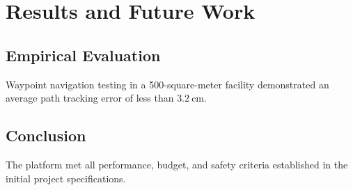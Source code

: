 \documentclass[12pt,a4paper]{report}
\begin{document}
\chapter{Results and Future Work}
\section{Empirical Evaluation}
Waypoint navigation testing in a 500-square-meter facility demonstrated an average path tracking error of less than $\qty{3.2}{\centi\meter}$.

\section{Conclusion}
The platform met all performance, budget, and safety criteria established in the initial project specifications.
\end{document}
